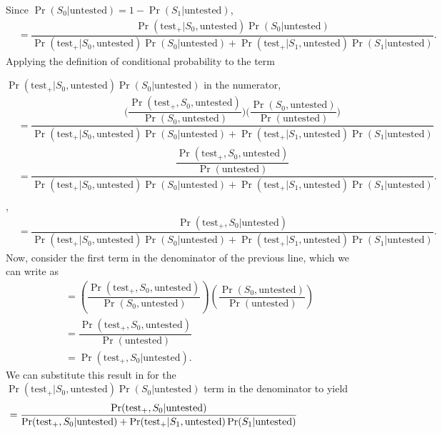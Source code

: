 \documentclass[12pt,twoside]{smiththesis}
\begin{document}
\noindent Since \(\Pr(S_0|\text{untested}) = 1 - \Pr(S_1|\text{untested})\),
\begin{align*} 
&=  \dfrac{{\Pr(\text{test}_+|S_0, \text{untested})}\Pr(S_0|\text{untested})}{\Pr(\text{test}_+|S_0, \text{untested})\Pr(S_0|\text{untested}) + \Pr(\text{test}_+|S_1, \text{untested}) \Pr(S_1|\text{untested})}.
\end{align*}
Applying the definition of conditional probability to the term

\noindent \(\Pr(\text{test}_+|S_0, \text{untested})\Pr(S_0|\text{untested})\) in the numerator,
\begin{align*}
&=
    \dfrac{\Big( \dfrac{\Pr(\text{test}_+,S_0, \text{untested})}{\Pr(S_0, \text{untested})} \Big) \Big(\dfrac{\Pr(S_0, \text{untested})}{\Pr(\text{untested})}\Big)}{\Pr(\text{test}_+|S_0, \text{untested})\Pr(S_0|\text{untested}) + \Pr(\text{test}_+|S_1, \text{untested}) \Pr(S_1|\text{untested})}\\ 
    &=  \dfrac{\dfrac{\Pr(\text{test}_+,S_0, \text{untested})}{\Pr(\text{untested})}}{\Pr(\text{test}_+|S_0, \text{untested})\Pr(S_0|\text{untested}) + \Pr(\text{test}_+|S_1, \text{untested}) \Pr(S_1|\text{untested})}.\\
    \end{align*}
,
\begin{align*} 
    &=  \dfrac{{\Pr(\text{test}_+,S_0|\text{untested})}}
 {\Pr(\text{test}_+|S_0, \text{untested})\Pr(S_0|\text{untested}) + \Pr(\text{test}_+|S_1, \text{untested}) \Pr(S_1|\text{untested})} .
\end{align*}
Now, consider the first term in the denominator of the previous line, which we can write as \begin{align*} &= \left(\dfrac{\Pr(\text{test}_+,S_0,\text{untested})}{\Pr(S_0,\text{untested})} \right) \left( \dfrac{\Pr(S_0,\text{untested})}{\Pr(\text{untested})}\right)\\
&= \dfrac{\Pr(\text{test}_+,S_0,\text{untested})}{\Pr(\text{untested})} \\
&=  \Pr(\text{test}_+,S_0|\text{untested}).
\end{align*}
\noindent We can substitute this result in for the \(\Pr(\text{test}_+|S_0, \text{untested})\Pr(S_0|\text{untested})\) term in the denominator to yield
\begin{align*}
  &=  \dfrac{{\Pr(\text{test}_+,S_0|\text{untested})}}{\Pr(\text{test}_+,S_0|\text{untested}) + \Pr(\text{test}_+|S_1, \text{untested}) \Pr(S_1|\text{untested})} \hspace{ 20 mm }
\end{align*}
\end{document}
